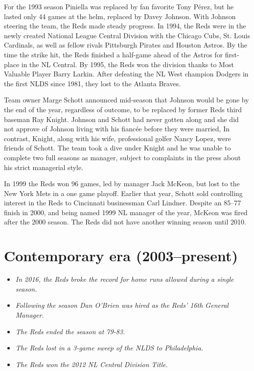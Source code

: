 For the 1993 season Piniella was replaced by fan favorite Tony Pérez,
but he lasted only 44 games at the helm, replaced by Davey Johnson. With
Johnson steering the team, the Reds made steady progress. In 1994, the
Reds were in the newly created National League Central Division with the
Chicago Cubs, St. Louis Cardinals, as well as fellow rivals Pittsburgh
Pirates and Houston Astros. By the time the strike hit, the Reds
finished a half-game ahead of the Astros for first-place in the NL
Central. By 1995, the Reds won the division thanks to Most Valuable
Player Barry Larkin. After defeating the NL West champion Dodgers in the
first NLDS since 1981, they lost to the Atlanta Braves.

Team owner Marge Schott announced mid-season that Johnson would be gone
by the end of the year, regardless of outcome, to be replaced by former
Reds third baseman Ray Knight. Johnson and Schott had never gotten along
and she did not approve of Johnson living with his fiancée before they
were married, In contrast, Knight, along with his wife, professional
golfer Nancy Lopez, were friends of Schott. The team took a dive under
Knight and he was unable to complete two full seasons as manager,
subject to complaints in the press about his strict managerial style.

In 1999 the Reds won 96 games, led by manager Jack McKeon, but lost to
the New York Mets in a one game playoff. Earlier that year, Schott sold
controlling interest in the Reds to Cincinnati businessman Carl Lindner.
Despite an 85--77 finish in 2000, and being named 1999 NL manager of the
year, McKeon was fired after the 2000 season. The Reds did not have
another winning season until 2010.

\section{Contemporary era
(2003--present)}\label{contemporary-era-2003present}

\begin{itemize}
\item
  \emph{In 2016, the Reds broke the record for home runs allowed during
  a single season.}
\item
  \emph{Following the season Dan O'Brien was hired as the Reds' 16th
  General Manager.}
\item
  \emph{The Reds ended the season at 79-83.}
\item
  \emph{The Reds lost in a 3-game sweep of the NLDS to Philadelphia.}
\item
  \emph{The Reds won the 2012 NL Central Division Title.}
\end{itemize}

